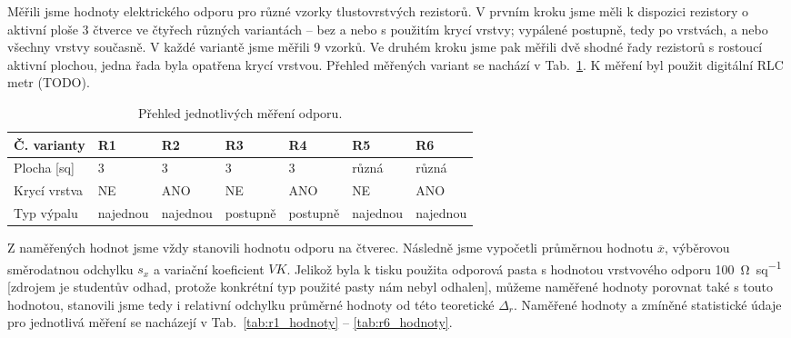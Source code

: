 Měřili jsme hodnoty elektrického odporu pro různé vzorky tlustovrstvých rezistorů. V prvním kroku jsme měli k dispozici rezistory o aktivní ploše 3 čtverce ve čtyřech různých variantách -- bez a nebo s použitím krycí vrstvy; vypálené postupně, tedy po vrstvách, a nebo všechny vrstvy současně. V každé variantě jsme měřili 9 vzorků. Ve druhém kroku jsme pak měřili dvě shodné řady rezistorů s rostoucí aktivní plochou, jedna řada byla opatřena krycí vrstvou. 
Přehled měřených variant se nachází v Tab.~\ref{tab:r_varianty}. 
K měření byl použit digitální RLC metr (TODO).

\begin{table}[h!]
    \caption{Přehled jednotlivých měření odporu.}
    \centering
    \def\arraystretch{1.4}
    \begin{tabular}{l|l|l|l|l|l|l}
        Č. varianty  & R1       & R2       & R3       & R4       & R5       & R6       \\ \hline
        Plocha [sq]  & 3        & 3        & 3        & 3        & různá    & různá    \\ \hline
        Krycí vrstva & NE       & ANO      & NE       & ANO      & NE       & ANO      \\ \hline
        Typ výpalu   & najednou & najednou & postupně & postupně & najednou & najednou \\ 
        \end{tabular}
    \label{tab:r_varianty}
\end{table}

Z naměřených hodnot jsme vždy stanovili hodnotu odporu na čtverec. Následně jsme vypočetli průměrnou hodnotu \(\overline{x} \), výběrovou směrodatnou odchylku \(s_{x} \) a variační koeficient \(VK\). Jelikož byla k tisku použita odporová pasta s hodnotou vrstvového odporu \qty{100}{\ohm\per sq} [zdrojem je studentův odhad, protože konkrétní typ použité pasty nám nebyl odhalen], můžeme naměřené hodnoty porovnat také s touto hodnotou, stanovili jsme tedy i relativní odchylku průměrné hodnoty od této teoretické \(\Delta_{r} \).
Naměřené hodnoty a zmíněné statistické údaje pro jednotlivá měření se nacházejí v Tab.~\ref{tab:r1_hodnoty} -- \ref{tab:r6_hodnoty}.


